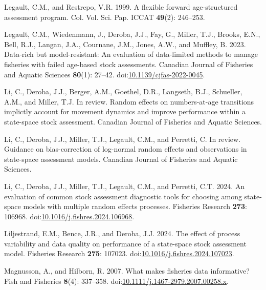 \documentclass[
  12pt,
]{article}
\newlength{\cslhangindent}
\newlength{\cslentryspacingunit} %
\newenvironment{CSLReferences}[2] %
 {%
  \setlength{\parindent}{0pt}
  \ifodd #1
  \let\oldpar\par
  \def\par{\hangindent=\cslhangindent\oldpar}
  \fi
  \setlength{\parskip}{#2\cslentryspacingunit}
 }%
 {}
\begin{document}
\begin{CSLReferences}{1}{0}
\leavevmode{}%
Legault, C.M., and Restrepo, V.R. 1999. A flexible forward
age-structured assessment program. Col. Vol. Sci. Pap. ICCAT
\textbf{49}(2): 246--253.

\leavevmode{}%
Legault, C.M., Wiedenmann, J., Deroba, J.J., Fay, G., Miller, T.J.,
Brooks, E.N., Bell, R.J., Langan, J.A., Cournane, J.M., Jones, A.W., and
Muffley, B. 2023. Data-rich but model-resistant: An evaluation of
data-limited methods to manage fisheries with failed age-based stock
assessments. Canadian Journal of Fisheries and Aquatic Sciences
\textbf{80}(1): 27--42.
doi:\href{https://doi.org/10.1139/cjfas-2022-0045}{10.1139/cjfas-2022-0045}.

\leavevmode{}%
Li, C., Deroba, J.J., Berger, A.M., Goethel, D.R., Langseth, B.J.,
Schueller, A.M., and Miller, T.J. In review. Random effects on
numbers-at-age transitions implictly account for movement dynamics and
improve performance within a state-space stock assessment. Canadian
Journal of Fisheries and Aquatic Sciences.

\leavevmode{}%
Li, C., Deroba, J.J., Miller, T.J., Legault, C.M., and Perretti, C. In
review. Guidance on bias-correction of log-normal random effects and
observations in state-space assessment models. Canadian Journal of
Fisheries and Aquatic Sciences.

\leavevmode{}%
Li, C., Deroba, J.J., Miller, T.J., Legault, C.M., and Perretti, C.T.
2024. An evaluation of common stock assessment diagnostic tools for
choosing among state-space models with multiple random effects
processes. Fisheries Research \textbf{273}: 106968.
doi:\href{https://doi.org/10.1016/j.fishres.2024.106968}{10.1016/j.fishres.2024.106968}.

\leavevmode{}%
Liljestrand, E.M., Bence, J.R., and Deroba, J.J. 2024. The effect of
process variability and data quality on performance of a state-space
stock assessment model. Fisheries Research \textbf{275}: 107023.
doi:\href{https://doi.org/10.1016/j.fishres.2024.107023}{10.1016/j.fishres.2024.107023}.

\leavevmode{}%
Magnusson, A., and Hilborn, R. 2007. What makes fisheries data
informative? Fish and Fisheries \textbf{8}(4): 337--358.
doi:\href{https://doi.org/10.1111/j.1467-2979.2007.00258.x}{10.1111/j.1467-2979.2007.00258.x}.


\end{CSLReferences}
\end{document}
